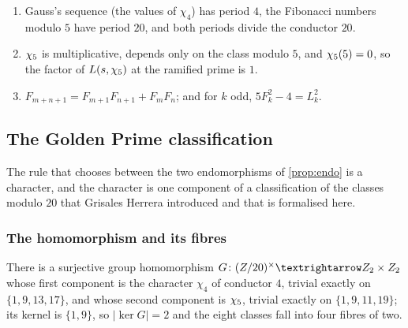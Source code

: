 \begin{proposition}\label{prop:two-periods}
\begin{enumerate}[label=\textup{(\roman*)}]
  \item Gauss's sequence (the values of $\chi_4$) has period $4$, the Fibonacci numbers
    modulo $5$ have period $20$, and both periods divide the conductor $20$.
    \item $\chi_5$ is multiplicative, depends only on the class modulo $5$, and $\chi_5(5)=0$, so the
    factor of $L(s,\chi_5)$ at the ramified prime is $1$.
  \item $F_{m+n+1}=F_{m+1}F_{n+1}+F_mF_n$; and for $k$ odd, $5F_k^2-4=L_k^2$.
\end{enumerate}
\end{proposition}

\subsection{The Golden Prime classification}\label{sec:grisales}

The rule that chooses between the two endomorphisms of \cref{prop:endo} is a
character, and the character is one component of a classification of the classes
modulo $20$ that Grisales Herrera introduced \cite{grisales25} and that is formalised here.

\subsubsection{The homomorphism and its fibres}

\begin{proposition}\label{prop:G}
There is a surjective group homomorphism
$G\colon\Zst\to\Z_2\times\Z_2$ whose first component is the character $\chi_4$ of
conductor $4$, trivial exactly on $\{1,9,13,17\}$, and whose second component is
$\chi_5$, trivial exactly on $\{1,9,11,19\}$; its kernel is $\{1,9\}$, so
$|\ker G|=2$ and the eight classes fall into four fibres of two.
\end{proposition}


